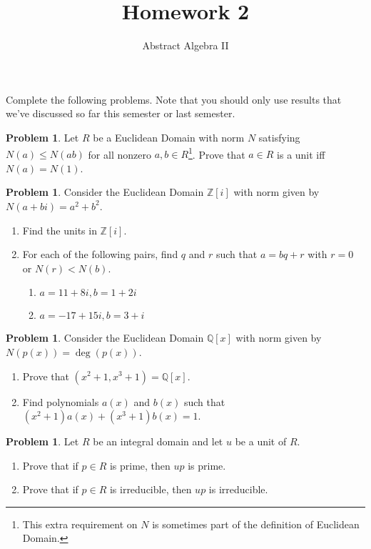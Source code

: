 \documentclass[11pt]{scrartcl}
\theoremstyle{definition}
\newtheorem{problem}[theorem]{Problem}
\begin{document}
\title{Homework 2}
\subtitle{Abstract Algebra II}
\date{}

\maketitle
\thispagestyle{fancy}

Complete the following problems. Note that you should only use results that we've discussed so far this semester or last semester.

\begin{problem}
Let $R$ be a Euclidean Domain with norm $N$ satisfying $N(a)\leq N(ab)$ for all nonzero $a,b\in R$\footnote{This extra requirement on $N$ is sometimes part of the definition of Euclidean Domain.}.  Prove that $a\in R$ is a unit iff $N(a)=N(1)$.
\end{problem}

\begin{problem}
Consider the Euclidean Domain $\mathbb{Z}[i]$ with norm given by $N(a+bi)=a^2+b^2$.  
\begin{enumerate}[label=\rm{(\alph*)}]
\item Find the units in $\mathbb{Z}[i]$.
\item For each of the following pairs, find $q$ and $r$ such that $a=bq+r$ with $r=0$ or $N(r)<N(b)$.
\begin{enumerate}[label=\rm{(\roman*)}]
\item $a=11+8i,b=1+2i$
\item $a=-17+15i,b=3+i$
\end{enumerate}
\end{enumerate}
\end{problem}

\begin{problem}
Consider the Euclidean Domain $\mathbb{Q}[x]$ with norm given by $N(p(x))=\deg(p(x))$. 
\begin{enumerate}[label=\rm{(\alph*)}]
\item Prove that $(x^2+1,x^3+1)=\mathbb{Q}[x]$.
\item Find polynomials $a(x)$ and $b(x)$ such that $(x^2+1)a(x)+(x^3+1)b(x)=1$.
\end{enumerate}
\end{problem}

\begin{problem}
Let $R$ be an integral domain and let $u$ be a unit of $R$.
\begin{enumerate}[label=\rm{(\alph*)}]
\item Prove that if $p\in R$ is prime, then $up$ is prime.
\item Prove that if $p\in R$ is irreducible, then $up$ is irreducible.
\end{enumerate}
\end{problem}
\end{document}
